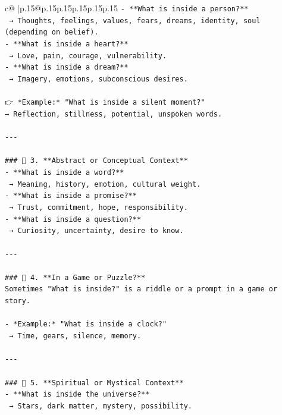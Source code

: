 \documentclass{article}
\begin{document}
{\begin{supertabular}{c@{$\;$}|p{.15\linewidth}@{}p{.15\linewidth}p{.15\linewidth}p{.15\linewidth}p{.15\linewidth}p{.15\linewidth}}
{{{\texttt{{-} **What is inside a person?**  } \\
\texttt{  → Thoughts, feelings, values, fears, dreams, identity, soul (depending on belief).} \\
\texttt{{-} **What is inside a heart?**  } \\
\texttt{  → Love, pain, courage, vulnerability.} \\
\texttt{{-} **What is inside a dream?**  } \\
\texttt{  → Imagery, emotions, subconscious desires.} \\
\\ 
\texttt{👉 *Example:* "What is inside a silent moment?"  } \\
\texttt{→ Reflection, stillness, potential, unspoken words.} \\
\\ 
\texttt{{-}{-}{-}} \\
\\ 
\texttt{\#\#\# 🔹 3. **Abstract or Conceptual Context**  } \\
\texttt{{-} **What is inside a word?**  } \\
\texttt{  → Meaning, history, emotion, cultural weight.} \\
\texttt{{-} **What is inside a promise?**  } \\
\texttt{  → Trust, commitment, hope, responsibility.} \\
\texttt{{-} **What is inside a question?**  } \\
\texttt{  → Curiosity, uncertainty, desire to know.} \\
\\ 
\texttt{{-}{-}{-}} \\
\\ 
\texttt{\#\#\# 🔹 4. **In a Game or Puzzle?**  } \\
\texttt{Sometimes "What is inside?" is a riddle or a prompt in a game or story.} \\
\\ 
\texttt{{-} *Example:* "What is inside a clock?"  } \\
\texttt{  → Time, gears, silence, memory.} \\
\\ 
\texttt{{-}{-}{-}} \\
\\ 
\texttt{\#\#\# 🔹 5. **Spiritual or Mystical Context**  } \\
\texttt{{-} **What is inside the universe?**  } \\
\texttt{  → Stars, dark matter, mystery, possibility.} \\
}}}
\end{supertabular}}
\end{document}
